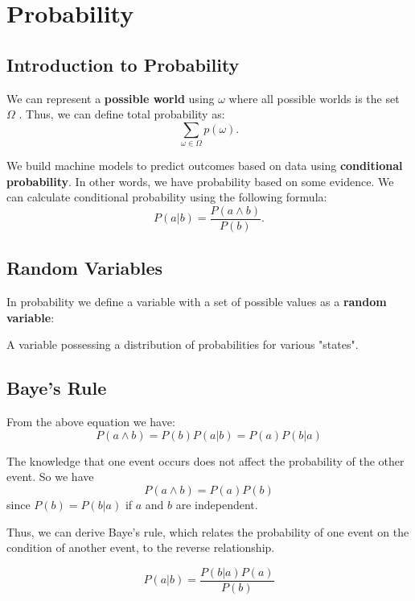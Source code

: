 \chapter{Probability}
\section{Introduction to Probability}

We can represent a \textbf{possible world} using \(\omega \) where all possible worlds is the set \(\Omega\) . Thus, we can define total probability as:
\[
	\sum_{\omega \in \Omega } p(\omega ).
\]

We build machine models to predict outcomes based on data using \textbf{conditional probability}. In other words, we have probability based on some evidence. We can calculate conditional probability using the following formula:
\[
	P(a | b) = \dfrac{P (a \land b)}{P(b)}.
\]

\section{Random Variables}
In probability we define a variable with a set of possible values as a \textbf{random variable}:

\begin{definition}
	A variable possessing a distribution of probabilities for various "states".
\end{definition}

\section{Baye's Rule}

From the above equation we have:
\[
	P(a \land b) = P(b) P(a | b) = P(a) P(b | a)
\]

\begin{definition}[Independence]
	The knowledge that one event occurs does not affect the probability of the other event. So we have
	\[
		P(a \land  b) = P(a)P(b)
	\]
	since \(P(b) = P(b | a)\) if \(a\) and \(b\) are independent.
\end{definition}

Thus, we can derive Baye's rule, which relates the probability of one event on the condition of another event, to the reverse relationship.

\begin{definition}
	\[
		P(a | b) = \dfrac{P(b | a) P(a)}{P(b)}
	\]
\end{definition}

